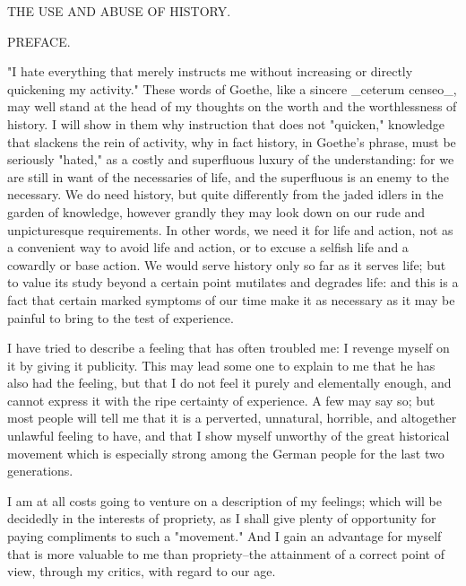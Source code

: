 THE USE AND ABUSE OF HISTORY.


PREFACE.


"I hate everything that merely instructs me without increasing or
directly quickening my activity." These words of Goethe, like a
sincere _ceterum censeo_, may well stand at the head of my thoughts
on the worth and the worthlessness of history. I will show in them
why instruction that does not "quicken," knowledge that slackens the
rein of activity, why in fact history, in Goethe's phrase, must be
seriously "hated," as a costly and superfluous luxury of the
understanding: for we are still in want of the necessaries of life,
and the superfluous is an enemy to the necessary. We do need history,
but quite differently from the jaded idlers in the garden of
knowledge, however grandly they may look down on our rude and
unpicturesque requirements. In other words, we need it for life and
action, not as a convenient way to avoid life and action, or to
excuse a selfish life and a cowardly or base action. We would serve
history only so far as it serves life; but to value its study beyond
a certain point mutilates and degrades life: and this is a fact that
certain marked symptoms of our time make it as necessary as it may be
painful to bring to the test of experience.

I have tried to describe a feeling that has often troubled me: I
revenge myself on it by giving it publicity. This may lead some one
to explain to me that he has also had the feeling, but that I do not
feel it purely and elementally enough, and cannot express it with the
ripe certainty of experience. A few may say so; but most people will
tell me that it is a perverted, unnatural, horrible, and altogether
unlawful feeling to have, and that I show myself unworthy of the
great historical movement which is especially strong among the German
people for the last two generations.

I am at all costs going to venture on a description of my feelings;
which will be decidedly in the interests of propriety, as I shall
give plenty of opportunity for paying compliments to such a
"movement." And I gain an advantage for myself that is more valuable
to me than propriety--the attainment of a correct point of view,
through my critics, with regard to our age.

